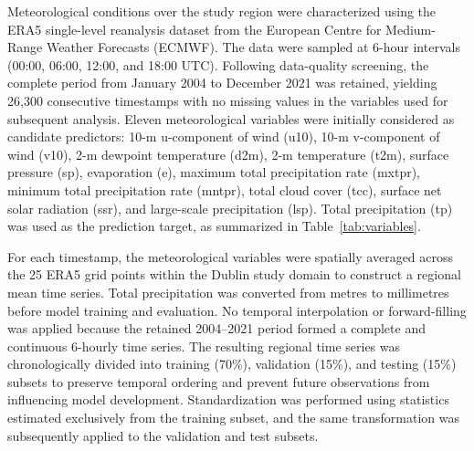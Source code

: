 \documentclass[referee,pdflatex,sn-basic]{sn-jnl}%
\theoremstyle{thmstyleone}%
\theoremstyle{thmstyletwo}%
\theoremstyle{thmstylethree}%
\begin{document}
Meteorological conditions over the study region were characterized using the ERA5 single-level reanalysis dataset from the European Centre for Medium-Range Weather Forecasts (ECMWF). The data were sampled at 6-hour intervals (00:00, 06:00, 12:00, and 18:00 UTC). Following data-quality screening, the complete period from January 2004 to December 2021 was retained, yielding 26,300 consecutive timestamps with no missing values in the variables used for subsequent analysis. Eleven meteorological variables were initially considered as candidate predictors: 10-m u-component of wind (u10), 10-m v-component of wind (v10), 2-m dewpoint temperature (d2m), 2-m temperature (t2m), surface pressure (sp), evaporation (e), maximum total precipitation rate (mxtpr), minimum total precipitation rate (mntpr), total cloud cover (tcc), surface net solar radiation (ssr), and large-scale precipitation (lsp). Total precipitation (tp) was used as the prediction target, as summarized in Table~\ref{tab:variables}.

For each timestamp, the meteorological variables were spatially averaged across the 25 ERA5 grid points within the Dublin study domain to construct a regional mean time series. Total precipitation was converted from metres to millimetres before model training and evaluation. No temporal interpolation or forward-filling was applied because the retained 2004--2021 period formed a complete and continuous 6-hourly time series. The resulting regional time series was chronologically divided into training (70\%), validation (15\%), and testing (15\%) subsets to preserve temporal ordering and prevent future observations from influencing model development. Standardization was performed using statistics estimated exclusively from the training subset, and the same transformation was subsequently applied to the validation and test subsets.
\end{document}
